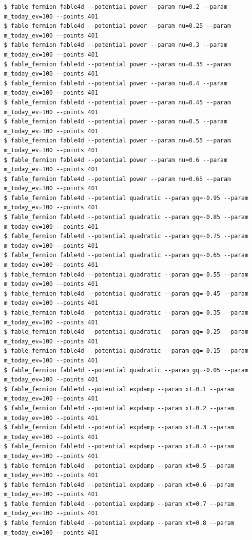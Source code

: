 \begin{Verbatim}
$ fable_fermion fable4d --potential power --param nu=0.2 --param m_today_ev=100 --points 401
$ fable_fermion fable4d --potential power --param nu=0.25 --param m_today_ev=100 --points 401
$ fable_fermion fable4d --potential power --param nu=0.3 --param m_today_ev=100 --points 401
$ fable_fermion fable4d --potential power --param nu=0.35 --param m_today_ev=100 --points 401
$ fable_fermion fable4d --potential power --param nu=0.4 --param m_today_ev=100 --points 401
$ fable_fermion fable4d --potential power --param nu=0.45 --param m_today_ev=100 --points 401
$ fable_fermion fable4d --potential power --param nu=0.5 --param m_today_ev=100 --points 401
$ fable_fermion fable4d --potential power --param nu=0.55 --param m_today_ev=100 --points 401
$ fable_fermion fable4d --potential power --param nu=0.6 --param m_today_ev=100 --points 401
$ fable_fermion fable4d --potential power --param nu=0.65 --param m_today_ev=100 --points 401
$ fable_fermion fable4d --potential quadratic --param gq=-0.95 --param m_today_ev=100 --points 401
$ fable_fermion fable4d --potential quadratic --param gq=-0.85 --param m_today_ev=100 --points 401
$ fable_fermion fable4d --potential quadratic --param gq=-0.75 --param m_today_ev=100 --points 401
$ fable_fermion fable4d --potential quadratic --param gq=-0.65 --param m_today_ev=100 --points 401
$ fable_fermion fable4d --potential quadratic --param gq=-0.55 --param m_today_ev=100 --points 401
$ fable_fermion fable4d --potential quadratic --param gq=-0.45 --param m_today_ev=100 --points 401
$ fable_fermion fable4d --potential quadratic --param gq=-0.35 --param m_today_ev=100 --points 401
$ fable_fermion fable4d --potential quadratic --param gq=-0.25 --param m_today_ev=100 --points 401
$ fable_fermion fable4d --potential quadratic --param gq=-0.15 --param m_today_ev=100 --points 401
$ fable_fermion fable4d --potential quadratic --param gq=-0.05 --param m_today_ev=100 --points 401
$ fable_fermion fable4d --potential expdamp --param xt=0.1 --param m_today_ev=100 --points 401
$ fable_fermion fable4d --potential expdamp --param xt=0.2 --param m_today_ev=100 --points 401
$ fable_fermion fable4d --potential expdamp --param xt=0.3 --param m_today_ev=100 --points 401
$ fable_fermion fable4d --potential expdamp --param xt=0.4 --param m_today_ev=100 --points 401
$ fable_fermion fable4d --potential expdamp --param xt=0.5 --param m_today_ev=100 --points 401
$ fable_fermion fable4d --potential expdamp --param xt=0.6 --param m_today_ev=100 --points 401
$ fable_fermion fable4d --potential expdamp --param xt=0.7 --param m_today_ev=100 --points 401
$ fable_fermion fable4d --potential expdamp --param xt=0.8 --param m_today_ev=100 --points 401

\end{Verbatim}
